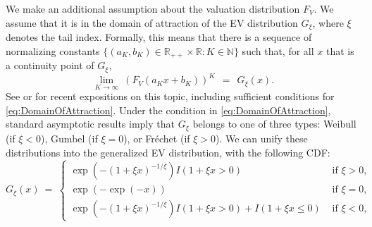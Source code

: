 We make an additional assumption about the valuation distribution $F_V$. We assume that it is in the domain of attraction of the EV distribution $G_\xi$, where $\xi$ denotes the tail index. Formally, this means that there is a sequence of normalizing constants $\{(a_{K},b_{K}) \in \mathbb{R}_{++} \times \mathbb{R} :K \in \mathbb{N}\}$ such that, for all $x$ that is a continuity point of $G_\xi$,
\begin{equation}
\lim_{K \to \infty} ~(F_V(a_{K} x + b_{K}))^{K} ~~=~~ G_\xi(x) .
\label{eq:DomainOfAttraction}
\end{equation}
See \citet[Chapter 1]{dehaan2006book} or \citet[Chapter 10]{david2004book} for recent expositions on this topic, including sufficient conditions for \eqref{eq:DomainOfAttraction}.
Under the condition in \eqref{eq:DomainOfAttraction}, standard asymptotic results imply that $G_\xi$ belongs to one of three types: Weibull (if $\xi < 0$), Gumbel (if $\xi = 0$), or Fr\'echet (if $\xi > 0$). We can unify these distributions into the generalized EV distribution, with the following CDF:
\begin{equation}
\label{eq:G}    
G_\xi(x) ~=~\left\{
\begin{array}{ll}
\exp( - (1 + \xi x)^{-1/\xi} ) I(1 + \xi x > 0)&\text{ if }\xi >0,\\
\exp(-\exp(-x)) &\text{ if }\xi =0,\\
\exp( - (1 + \xi x)^{-1/\xi} ) I(1 + \xi x > 0) +  I(1 + \xi x \leq 0) &\text{ if }\xi <0,
\end{array} 
\right.
\end{equation}
